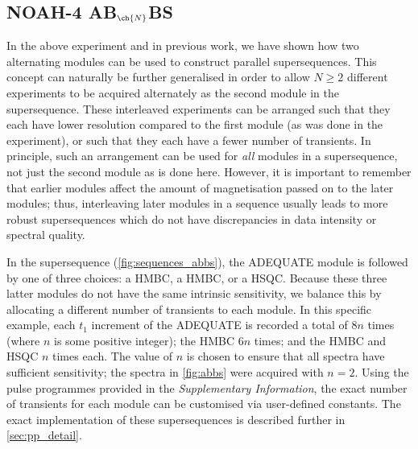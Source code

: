 \documentclass[a4paper,12pt]{article}
\newcommand{\carbon}{\ch{^{13}C}}
\newcommand{\nitrogen}{\ch{^{15}N}}
\newcommand{\SInf}{\textit{Supplementary Information}}
\newcommand{\changed}[1]{{\color{DodgerBlue!75!blue}#1}}
\begin{document}
\begin{refsection}
\section{NOAH-4 AB\texorpdfstring{$_{\ch{N}}$}{n}BS}

\changed{
In the above  experiment and in previous work,\autocite{Kupce2021JACSA} we have shown how two alternating modules can be used to construct parallel supersequences.
This concept can naturally be further generalised in order to allow $N \geq 2$ different experiments to be acquired alternately as the second module in the supersequence.
These interleaved experiments can be arranged such that they each have lower resolution compared to the first module (as was done in the \noah*{A,Bn,Bn} experiment), or such that they each have a fewer number of transients.
In principle, such an arrangement can be used for \textit{all} modules in a supersequence, not just the second module as is done here.
However, it is important to remember that earlier modules affect the amount of magnetisation passed on to the later modules; thus, interleaving later modules in a sequence usually leads to more robust supersequences which do not have discrepancies in data intensity or spectral quality.
}

\changed{
In the  supersequence (\cref{fig:sequences_abbs}), the ADEQUATE module is followed by one of three choices: a \nitrogen{} HMBC, a \carbon{} HMBC, or a \carbon{} HSQC.
Because these three latter modules do not have the same intrinsic sensitivity, we balance this by allocating a different number of transients to each module.
In this specific example, each $t_1$ increment of the ADEQUATE is recorded a total of $8n$ times (where $n$ is some positive integer); the \nitrogen{} HMBC $6n$ times; and the \carbon{} HMBC and HSQC $n$ times each.
The value of $n$ is chosen to ensure that all spectra have sufficient sensitivity; the spectra in \cref{fig:abbs} were acquired with $n = 2$.
Using the pulse programmes provided in the \SInf{}, the exact number of transients for each module can be customised via user-defined constants.
The exact implementation of these supersequences is described further in \cref{sec:pp_detail}.
}


\end{refsection}
\end{document}
